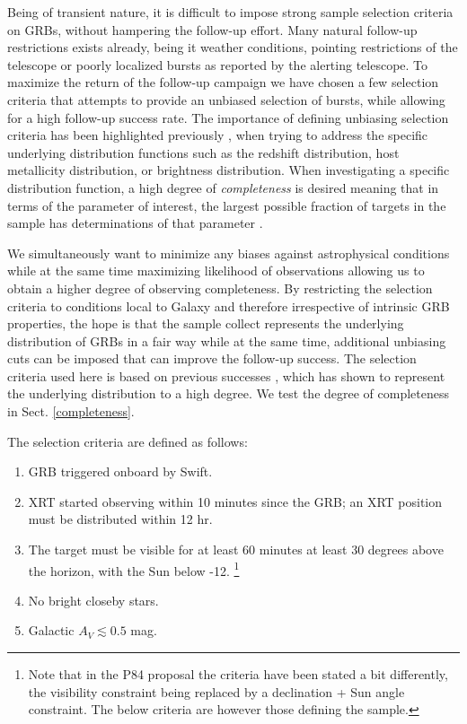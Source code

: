 \documentclass{aa}    %
\begin{document}
Being of transient nature, it is difficult to impose strong sample selection
criteria on GRBs, without hampering the follow-up effort. Many natural follow-up
restrictions exists already, being it weather conditions, pointing restrictions
of the telescope or poorly localized bursts as reported by the alerting
telescope. To maximize the return of the follow-up campaign we have chosen a few
selection criteria that attempts to provide an unbiased selection of bursts,
while allowing for a high follow-up success rate. The importance of defining
unbiasing selection criteria has been highlighted previously
\citep{Salvaterra2012, Hjorth2012, Vergani2015, Perley2016a}, when trying to
address the specific underlying distribution functions such as the redshift
distribution, host metallicity distribution, or brightness distribution. When
investigating a specific distribution function, a high degree of
\textit{completeness} is desired meaning that in terms of the parameter of
interest, the largest possible fraction of targets in the sample has
determinations of that parameter \citep{Perley2016b}.

We simultaneously want to minimize any biases against astrophysical conditions
while at the same time maximizing likelihood of observations allowing us to
obtain a higher degree of observing completeness. By restricting the selection
criteria to conditions local to Galaxy and therefore irrespective of intrinsic
GRB properties, the hope is that the sample collect represents the underlying
distribution of GRBs in a fair way while at the same time, additional unbiasing
cuts can be imposed that can improve the follow-up success. The selection
criteria used here is based on previous successes \cite{Jakobsson2006b,
	Fynbo2009, Hjorth2012}, which has shown to represent the underlying distribution
to a high degree. We test the degree of completeness in Sect.
\ref{completeness}.

The selection criteria are defined as follows:

\begin{enumerate}
	\item GRB triggered onboard by Swift.
	\item XRT started observing within 10 minutes since the GRB; an XRT position must be distributed within 12 hr.
	\item The target must be visible for at least 60 minutes at least 30 degrees above the horizon, with the Sun below -12.
	\footnote{Note that in the P84 proposal the criteria have
	been stated a bit differently, the visibility constraint being replaced by a
	declination + Sun angle constraint. The below criteria are however those
	defining the sample.}
	\item No bright closeby stars.
	\item Galactic $A_V \lesssim 0.5$ mag.
\end{enumerate}
\end{document}
